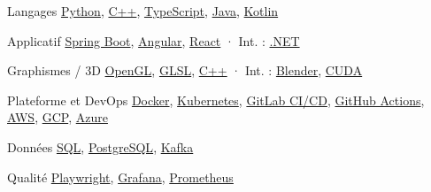 
\begin{cvskills}

\cvskill
{Langages} %
{\href{https://www.python.org/}{Python}, \href{https://isocpp.org/}{C++}, \href{https://www.typescriptlang.org/}{TypeScript}, \href{https://dev.java/}{Java}, \href{https://kotlinlang.org/}{Kotlin}} %

\cvskill
{Applicatif} %
{\href{https://spring.io/projects/spring-boot}{Spring Boot}, \href{https://angular.dev/}{Angular}, \href{https://react.dev/}{React} · Int. : \href{https://dotnet.microsoft.com/}{.NET}} %

\cvskill
{Graphismes / 3D} %
{\href{https://www.opengl.org/}{OpenGL}, \href{https://www.khronos.org/opengl/wiki/OpenGL_Shading_Language}{GLSL}, \href{https://isocpp.org/}{C++} · Int. : \href{https://www.blender.org/}{Blender}, \href{https://developer.nvidia.com/cuda-toolkit}{CUDA}} %

\cvskill
{Plateforme et DevOps} %
{\href{https://www.docker.com/}{Docker}, \href{https://kubernetes.io/}{Kubernetes}, \href{https://docs.gitlab.com/ee/ci/}{GitLab CI/CD}, \href{https://docs.github.com/en/actions}{GitHub Actions}, \href{https://aws.amazon.com/}{AWS}, \href{https://cloud.google.com/}{GCP}, \href{https://azure.microsoft.com/}{Azure}} %

\cvskill
{Données} %
{\href{https://www.iso.org/standard/76583.html}{SQL}, \href{https://www.postgresql.org/}{PostgreSQL}, \href{https://kafka.apache.org/}{Kafka}} %

\cvskill
{Qualité} %
{\href{https://playwright.dev/}{Playwright}, \href{https://grafana.com/}{Grafana}, \href{https://prometheus.io/}{Prometheus}} %


\end{cvskills}
